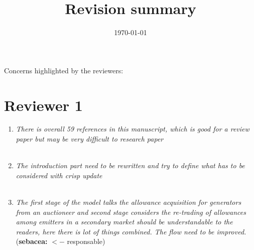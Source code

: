 \documentclass[a4paper]{amsart}
\newcommand{\seba}[1]{{\color{blue}({\bf sebacea: }#1)}}
\theoremstyle{plain}
\theoremstyle{definition}
\theoremstyle{remark}
\numberwithin{equation}{section}
\begin{document}
\title[Revision summary]
      {Revision summary}

\maketitle

\date{\today}

Concerns highlighted by the reviewers:\\




\section*{Reviewer 1}


\begin{enumerate}

\item \emph{There is overall 59 references in this manuscript, which is good for a review paper but may be very difficult to research paper}\\

{\color{blue}{details.}}\\

\item \emph{The introduction part need to be rewritten and try to define what has to be considered with crisp update}\\

{\color{blue}{details.}}\\

\item \emph{The first stage of the model talks the allowance acquisition for generators from an auctioneer and second stage considers the re-trading of allowances among emitters in a secondary market should be understandable to the readers, here there is lot of things combined. The flow need to be improved.} \seba{$<-$ responsable}\\

{\color{blue}{We include a diagram to make explicit the timing of the model. Furthermore, we improve the description of the model.}}\\

\begin{figure}[h]
\centering

\begin{tikzpicture}[scale=0.5,timespan={}]


\end{tikzpicture}
\end{figure}
\end{enumerate}
\end{document}
